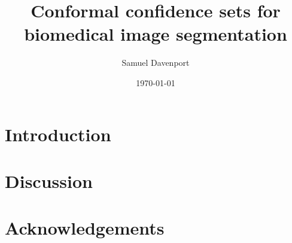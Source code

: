 \documentclass[12pt]{article}
\title{Conformal confidence sets for biomedical image segmentation}
\author{Samuel Davenport}
\date{\today}
\theoremstyle{definition}
\begin{document}
	
\maketitle

\begin{abstract}
	
\end{abstract}

\section{Introduction}




\section{Discussion}



\section*{Acknowledgements}






\end{document}
